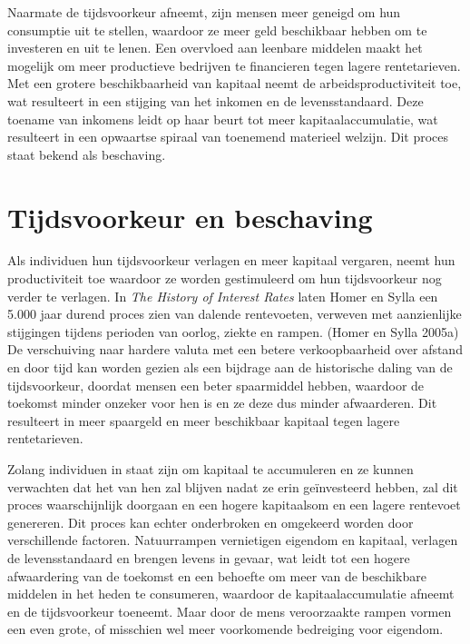 \documentclass[
  a5paper,
  smalldemyvopaper,11pt,twoside,onecolumn,openright,extrafontsizes,
hidelinks]{memoir}
\begin{document}
Naarmate de tijdsvoorkeur afneemt, zijn mensen meer geneigd om hun
consumptie uit te stellen, waardoor ze meer geld beschikbaar hebben om
te investeren en uit te lenen. Een overvloed aan leenbare middelen maakt
het mogelijk om meer productieve bedrijven te financieren tegen lagere
rentetarieven. Met een grotere beschikbaarheid van kapitaal neemt de
arbeidsproductiviteit toe, wat resulteert in een stijging van het
inkomen en de levensstandaard. Deze toename van inkomens leidt op haar
beurt tot meer kapitaalaccumulatie, wat resulteert in een opwaartse
spiraal van toenemend materieel welzijn. Dit proces staat bekend als
beschaving.

\section{Tijdsvoorkeur en beschaving}\label{tijdsvoorkeur-en-beschaving}

Als individuen hun tijdsvoorkeur verlagen en meer kapitaal vergaren,
neemt hun productiviteit toe waardoor ze worden gestimuleerd om hun
tijdsvoorkeur nog verder te verlagen. In \emph{The History of Interest
Rates} laten Homer en Sylla een 5.000 jaar durend proces zien van
dalende rentevoeten, verweven met aanzienlijke stijgingen tijdens
perioden van oorlog, ziekte en rampen. (Homer en Sylla 2005a) De
verschuiving naar hardere valuta met een betere verkoopbaarheid over
afstand en door tijd kan worden gezien als een bijdrage aan de
historische daling van de tijdsvoorkeur, doordat mensen een beter
spaarmiddel hebben, waardoor de toekomst minder onzeker voor hen is en
ze deze dus minder afwaarderen. Dit resulteert in meer spaargeld en meer
beschikbaar kapitaal tegen lagere rentetarieven.

Zolang individuen in staat zijn om kapitaal te accumuleren en ze kunnen
verwachten dat het van hen zal blijven nadat ze erin geïnvesteerd
hebben, zal dit proces waarschijnlijk doorgaan en een hogere kapitaalsom
en een lagere rentevoet genereren. Dit proces kan echter onderbroken en
omgekeerd worden door verschillende factoren. Natuurrampen vernietigen
eigendom en kapitaal, verlagen de levensstandaard en brengen levens in
gevaar, wat leidt tot een hogere afwaardering van de toekomst en een
behoefte om meer van de beschikbare middelen in het heden te consumeren,
waardoor de kapitaalaccumulatie afneemt en de tijdsvoorkeur toeneemt.
Maar door de mens veroorzaakte rampen vormen een even grote, of
misschien wel meer voorkomende bedreiging voor eigendom.
\end{document}

